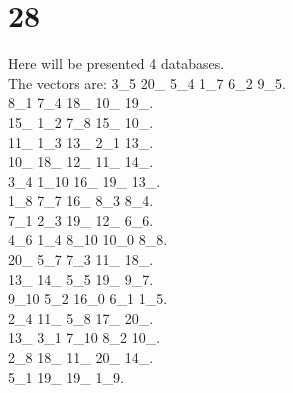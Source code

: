 \chapter{28}
\indent Here will be presented 4 databases.\\
The vectors are:
3\_5 20\_ 5\_4 1\_7 6\_2 9\_5.\\8\_1 7\_4 18\_ 10\_ 19\_.\\15\_ 1\_2 7\_8 15\_ 10\_.\\11\_ 1\_3 13\_ 2\_1 13\_.\\10\_ 18\_ 12\_ 11\_ 14\_.\\3\_4 1\_10 16\_ 19\_ 13\_.\\1\_8 7\_7 16\_ 8\_3 8\_4.\\7\_1 2\_3 19\_ 12\_ 6\_6.\\4\_6 1\_4 8\_10 10\_0 8\_8.\\20\_ 5\_7 7\_3 11\_ 18\_.\\13\_ 14\_ 5\_5 19\_ 9\_7.\\9\_10 5\_2 16\_0 6\_1 1\_5.\\2\_4 11\_ 5\_8 17\_ 20\_.\\13\_ 3\_1 7\_10 8\_2 10\_.\\2\_8 18\_ 11\_ 20\_ 14\_.\\5\_1 19\_ 19\_ 1\_9.\\